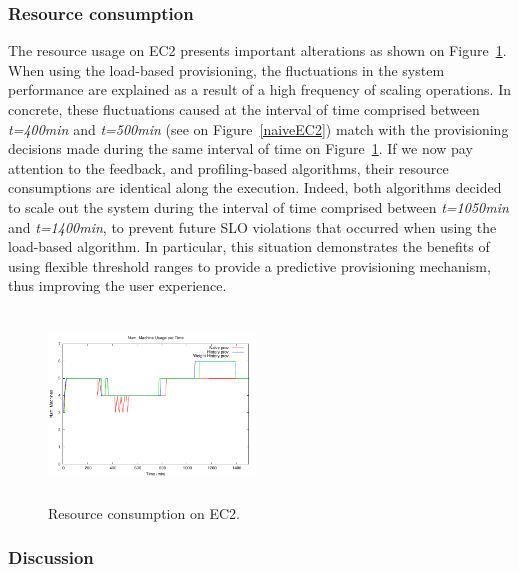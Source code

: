 \subsubsection{Resource consumption}

The resource usage on EC2 presents important alterations as shown on Figure~\ref{resEC2}. When using the load-based provisioning, the fluctuations in the system performance are explained as a result of a high frequency of scaling operations. In concrete, these fluctuations caused at the interval of time comprised between \emph{t=400min} and \emph{t=500min} (see on Figure~\ref{naiveEC2}) match with the provisioning decisions made during the same interval of time on Figure~\ref{resEC2}. If we now pay attention to the feedback, and profiling-based algorithms, their resource consumptions are identical along the execution. Indeed, both algorithms decided to scale out the system during the interval of time comprised between \emph{t=1050min} and \emph{t=1400min}, to prevent future SLO violations that occurred when using the load-based algorithm. In particular, this situation demonstrates the benefits of using flexible threshold ranges to provide a predictive provisioning mechanism, thus improving the user experience.


\begin{figure}
\begin{center}
\includegraphics[width=0.49\textwidth, height=5cm]{./images/heterogeneous/numMachinesCompEC2}
\end{center}
\caption{Resource consumption on EC2.}
\label{resEC2}
\end{figure}


\subsubsection{Discussion}



